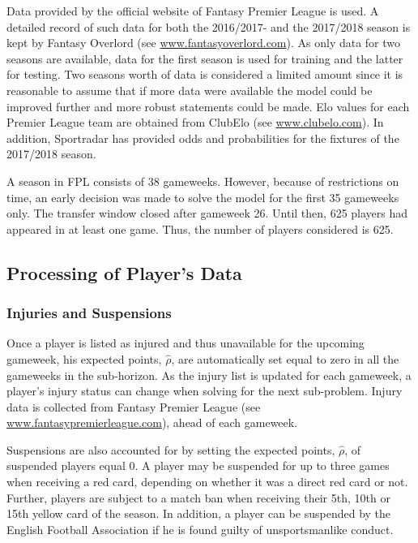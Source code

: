 Data provided by the official website of Fantasy Premier League is used. A detailed record of such data for both the 2016/2017- and the 2017/2018 season is kept by Fantasy Overlord (see \url{www.fantasyoverlord.com}). As only data for two seasons are available, data for the first season is used for training and the latter for testing. Two seasons worth of data is considered a limited amount since it is reasonable to assume that if more data were available the model could be improved further and more robust statements could be made. Elo values for each Premier League team are obtained from ClubElo (see \url{www.clubelo.com}). In addition, Sportradar has provided odds and probabilities for the fixtures of the 2017/2018 season. 

\newpar

A season in FPL consists of 38 gameweeks. However, because of restrictions on time, an early decision was made to solve the model for the first 35 gameweeks only. The transfer window closed after gameweek 26. Until then, 625 players had appeared in at least one game. Thus, the number of players considered is 625.

\subsection{Processing of Player's Data}

\subsubsection{Injuries and Suspensions}
Once a player is listed as injured and thus unavailable for the upcoming gameweek, his expected points, $\hat{\rho}$, are automatically set equal to zero in all the gameweeks in the sub-horizon. As the injury list is updated for each gameweek, a player's injury status can change when solving for the next sub-problem. Injury data is collected from Fantasy Premier League (see \url{www.fantasypremierleague.com}), ahead of each gameweek. 

\newpar

Suspensions are also accounted for by setting the expected points, $\hat{\rho}$, of suspended players equal 0. A player may be suspended for up to three games when receiving a red card, depending on whether it was a direct red card or not. Further, players are subject to a match ban when receiving their 5th, 10th or 15th yellow card of the season. In addition, a player can be suspended by the English Football Association if he is found guilty of unsportsmanlike conduct. 



